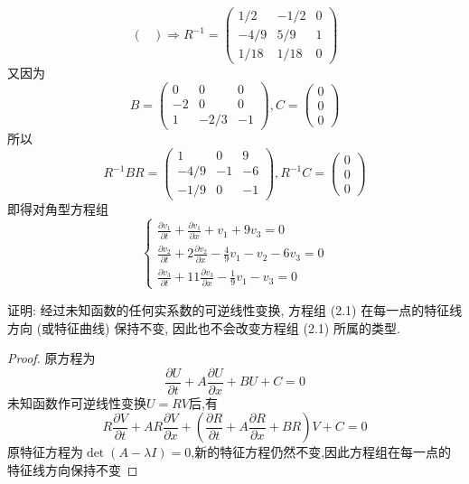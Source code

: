 \begin{solve}
\[\begin{pmatrix}
  \end{pmatrix}
  \Rightarrow
  R^{-1}=
  \begin{pmatrix}
  1/2&-1/2&0\\-4/9&5/9&1\\1/18&1/18&0
  \end{pmatrix}\]
  又因为
  \[B=\begin{pmatrix}
  0&0&0\\-2&0&0\\1&-2/3&-1
  \end{pmatrix},C=\begin{pmatrix}
  0\\0\\0
  \end{pmatrix}\]
  所以
  \[R^{-1}BR=\begin{pmatrix}
  1&0&9\\-4/9&-1&-6\\-1/9&0&-1
  \end{pmatrix},R^{-1}C=\begin{pmatrix}
  0\\0\\0
  \end{pmatrix}\]
  即得对角型方程组
  \[\begin{cases}
  \frac{\partial v_1}{\partial t}+\frac{\partial v_1}{\partial x}+v_1+9v_3=0\\
  \frac{\partial v_2}{\partial t}+2\frac{\partial v_2}{\partial x}-\frac{4}{9}v_1-v_2-6v_3=0\\
  \frac{\partial v_3}{\partial t}+11\frac{\partial v_3}{\partial x}-\frac{1}{9}v_1-v_3=0
  \end{cases}\]
\end{solve}


\begin{exercise}
  证明: 经过未知函数的任何实系数的可逆线性变换, 方程组 (2.1) 在每一点的特征线方向
  (或特征曲线) 保持不变, 因此也不会改变方程组 (2.1) 所属的类型.
\end{exercise}

\begin{proof}
  原方程为
  \[\frac{\partial U}{\partial t}+A\frac{\partial U}{\partial x}+BU+C=0\]
  未知函数作可逆线性变换$U=RV$后,有
  \[R\frac{\partial V}{\partial t}+AR\frac{\partial V}{\partial x}+\left(\frac{\partial R}{\partial t}+A\frac{\partial R}{\partial x}+BR\right)V+C=0\]
  原特征方程为$\det(A-\lambda I)=0$,新的特征方程仍然不变,因此方程组在每一点的特征线方向保持不变
\end{proof}
